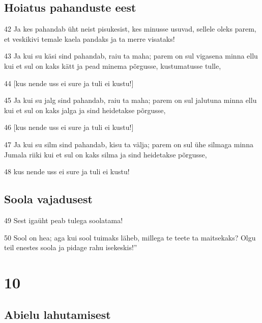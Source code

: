 \section*{Hoiatus pahanduste eest}

\par 42 Ja kes pahandab üht neist pisukesist, kes minusse usuvad, sellele oleks parem, et veskikivi temale kaela pandaks ja ta merre visataks!
\par 43 Ja kui su käsi sind pahandab, raiu ta maha; parem on sul vigasena minna ellu kui et sul on kaks kätt ja pead minema põrgusse, kustumatusse tulle,
\par 44 [kus nende uss ei sure ja tuli ei kustu!]
\par 45 Ja kui su jalg sind pahandab, raiu ta maha; parem on sul jalutuna minna ellu kui et sul on kaks jalga ja sind heidetakse põrgusse,
\par 46 [kus nende uss ei sure ja tuli ei kustu!]
\par 47 Ja kui su silm sind pahandab, kisu ta välja; parem on sul ühe silmaga minna Jumala riiki kui et sul on kaks silma ja sind heidetakse põrgusse,
\par 48 kus nende uss ei sure ja tuli ei kustu!

\section*{Soola vajadusest}

\par 49 Sest igaüht peab tulega soolatama!
\par 50 Sool on hea; aga kui sool tuimaks läheb, millega te teete ta maitsekaks? Olgu teil enestes soola ja pidage rahu isekeskis!”


\chapter{10}

\section*{Abielu lahutamisest}

